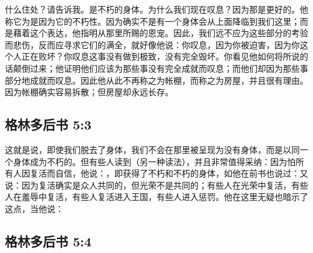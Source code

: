 什么住处？请告诉我。是不朽的身体。为什么我们现在叹息？因为那是更好的。他称它为是因为它的不朽性。因为确实不是有一个身体会从上面降临到我们这里；而是藉着这个表达，他指明从那里所赐的恩宠。因此，我们远不应为这些部分的考验而悲伤，反而应寻求它们的满全，就好像他说：你叹息，因为你被迫害，因为你这个人正在败坏？你叹息这事没有做到极致，没有完全毁坏。你看见他如何将所说的话颠倒过来；他证明他们应该为那些事没有完全成就而叹息；而他们却因为那些事部分地成就而叹息。因此他从此不再称之为帐棚，而称之为房屋，并且很有理由。因为帐棚确实容易拆散；但房屋却永远长存。\par


\subsection{格林多后书 5:3}

\par

这就是说，即使我们脱去了身体，我们不会在那里被呈现为没有身体，而是以同一个身体成为不朽的。但有些人读到（另一种读法），并且非常值得采纳：因为怕所有人因复活而自信，他说：，即获得了不朽和不朽的身体，如他在前书也说过：又说：因为复活确实是众人共同的，但光荣不是共同的；有些人在光荣中复活，有些人在羞辱中复活，有些人复活进入王国，有些人进入惩罚。他在这里无疑也暗示了这点，当他说：\par


\subsection{格林多后书 5:4}

